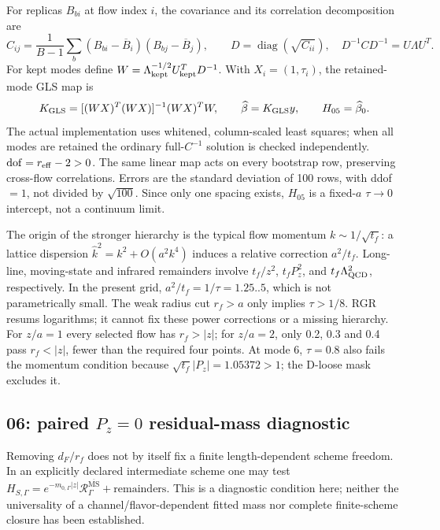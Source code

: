 \documentclass[11pt]{article}
\numberwithin{equation}{section}
\newcommand{\MSbar}{\overline{\mathrm{MS}}}
\begin{document}
For replicas \(B_{bi}\) at flow index \(i\), the covariance and its
correlation decomposition are
\begin{equation}
 C_{ij}=\frac1{B-1}\sum_b
 (B_{bi}-\overline B_i)(B_{bj}-\overline B_j),\qquad
 D=\operatorname{diag}(\sqrt{C_{ii}}),\quad
 D^{-1}CD^{-1}=U\Lambda U^T .
\end{equation}
For kept modes define
\(W=\Lambda_{\rm kept}^{-1/2}U_{\rm kept}^TD^{-1}\).
With \(X_i=(1,\tau_i)\), the retained-mode GLS map is
\begin{equation}
 K_{\rm GLS}=[(WX)^T(WX)]^{-1}(WX)^TW,\qquad
 \widehat\beta=K_{\rm GLS}y,\qquad H_{05}=\widehat\beta_0.
\label{eq:l32x64-gls-intercept}
\end{equation}
The actual implementation uses whitened, column-scaled least squares;
when all modes are retained the ordinary full-\(C^{-1}\) solution is
checked independently.  \(\mathrm{dof}=r_{\rm eff}-2>0\).
The same linear map acts on every bootstrap row, preserving cross-flow
correlations.  Errors are the standard deviation of 100 rows, with ddof
\(=1\), not divided by \(\sqrt{100}\).  Since only one spacing exists,
\(H_{05}\) is a fixed-\(a\) \(\tau\to0\) intercept, not a continuum limit.

The origin of the stronger hierarchy is the typical flow momentum
\(k\sim1/\sqrt{t_f}\): a lattice dispersion
\(\widehat k^2=k^2+O(a^2k^4)\) induces a relative correction
\(a^2/t_f\).  Long-line, moving-state and infrared remainders involve
\(t_f/z^2\), \(t_fP_z^2\), and \(t_f\Lambda_{\rm QCD}^2\), respectively.
In the present grid, \(a^2/t_f=1/\tau=1.25..5\), which is not
parametrically small.  The weak radius cut \(r_f>a\) only implies
\(\tau>1/8\).  RGR resums logarithms; it cannot fix these power
corrections or a missing hierarchy.
For \(z/a=1\) every selected flow has \(r_f>|z|\); for \(z/a=2\), only
0.2, 0.3 and 0.4 pass \(r_f<|z|\), fewer than the required four points.
At mode 6, \(\tau=0.8\) also fails the momentum condition because
\(\sqrt{t_f}|P_z|=1.05372>1\); the D-loose mask excludes it.

\subsection{06: paired \(P_z=0\) residual-mass diagnostic}

Removing \(d_F/r_f\) does not by itself fix a finite length-dependent
scheme freedom.  In an explicitly declared intermediate scheme one may
test \(H_{S,\Gamma}=e^{-m_{0,\Gamma}|z|}
\mathcal R_\Gamma^{\MSbar}+\text{remainders}\).
This is a diagnostic condition here; neither the universality of a
channel/flavor-dependent fitted mass nor complete finite-scheme closure
has been established.
\end{document}
